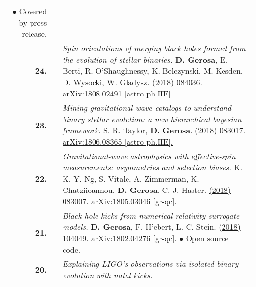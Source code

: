 {\begin{longtable}{rp{0.3cm}p{15.8cm}}
\newline{}
\textcolor{color1}{$\bullet$} Covered by press release.
\vspace{0.09cm}\\
%
\textbf{24.} & & \textit{Spin orientations of merging black holes formed from the evolution of stellar binaries.}
\newline{}
\textbf{D. Gerosa}, E. Berti, R. O'Shaughnessy, K. Belczynski, M. Kesden, D. Wysocki, W. Gladysz.
\newline{}
\href{https://journals.aps.org/prd/abstract/10.1103/PhysRevD.98.084036}{\prd 98 (2018) 084036}. \href{https://arxiv.org/abs/1808.02491}{arXiv:1808.02491 [astro-ph.HE].}
\vspace{0.09cm}\\
%
\textbf{23.} & & \textit{Mining gravitational-wave catalogs to understand binary stellar evolution: a new hierarchical bayesian framework.}
\newline{}
S. R. Taylor, \textbf{D. Gerosa}.
\newline{}
\href{https://journals.aps.org/prd/abstract/10.1103/PhysRevD.98.083017}{\prd 98 (2018) 083017}. \href{https://arxiv.org/abs/1806.08365}{arXiv:1806.08365 [astro-ph.HE].}
\vspace{0.09cm}\\
%
\textbf{22.} & & \textit{Gravitational-wave astrophysics with effective-spin measurements: asymmetries and selection biases.}
\newline{}
K. K. Y. Ng, S. Vitale, A. Zimmerman, K. Chatziioannou, \textbf{D. Gerosa}, C.-J. Haster.
\newline{}
\href{https://journals.aps.org/prd/abstract/10.1103/PhysRevD.98.083007}{\prd 98 (2018) 083007}. \href{https://arxiv.org/abs/1805.03046}{arXiv:1805.03046 [gr-qc].}
\vspace{0.09cm}\\
%
\textbf{21.} & & \textit{Black-hole kicks from numerical-relativity surrogate models.}
\newline{}
\textbf{D. Gerosa}, F. H'ebert, L. C. Stein.
\newline{}
\href{https://journals.aps.org/prd/abstract/10.1103/PhysRevD.97.104049}{\prd 97 (2018) 104049}. \href{https://arxiv.org/abs/1802.04276}{arXiv:1802.04276 [gr-qc].}
\newline{}
\textcolor{color1}{$\bullet$} Open source code.
\vspace{0.09cm}\\
%
\textbf{20.} & & \textit{Explaining LIGO's observations via isolated binary evolution with natal kicks.}

\end{longtable}}
